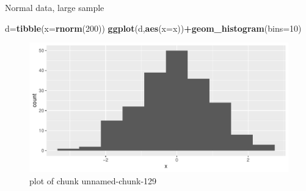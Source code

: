 \documentclass[ignorenonframetext,]{beamer}
\newenvironment{Shaded}{\begin{snugshade}}{\end{snugshade}}
\newcommand{\DataTypeTok}[1]{\textcolor[rgb]{0.13,0.29,0.53}{#1}}
\newcommand{\DecValTok}[1]{\textcolor[rgb]{0.00,0.00,0.81}{#1}}
\newcommand{\KeywordTok}[1]{\textcolor[rgb]{0.13,0.29,0.53}{\textbf{#1}}}
\newcommand{\NormalTok}[1]{#1}
\newcommand{\OperatorTok}[1]{\textcolor[rgb]{0.81,0.36,0.00}{\textbf{#1}}}
\begin{document}
\begin{frame}[fragile]{Normal data, large sample}
\protect\hypertarget{normal-data-large-sample}{}

\begin{Shaded}
\begin{Highlighting}[]
\NormalTok{d=}\KeywordTok{tibble}\NormalTok{(}\DataTypeTok{x=}\KeywordTok{rnorm}\NormalTok{(}\DecValTok{200}\NormalTok{))}
\KeywordTok{ggplot}\NormalTok{(d,}\KeywordTok{aes}\NormalTok{(}\DataTypeTok{x=}\NormalTok{x))}\OperatorTok{+}\KeywordTok{geom_histogram}\NormalTok{(}\DataTypeTok{bins=}\DecValTok{10}\NormalTok{)}
\end{Highlighting}
\end{Shaded}

\begin{figure}
\centering
\includegraphics{figure/unnamed-chunk-129-1.pdf}
\caption{plot of chunk unnamed-chunk-129}
\end{figure}

\end{frame}
\end{document}
